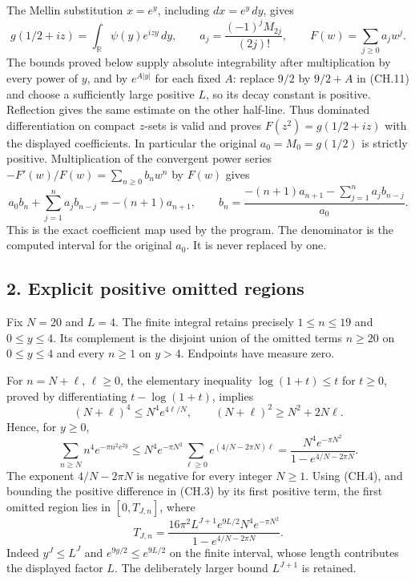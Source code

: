 The Mellin substitution \(x=e^y\), including \(dx=e^y\,dy\), gives \[
 g(1/2+iz)=\int_{\mathbb R}\psi(y)e^{izy}\,dy,\qquad
 a_j=\frac{(-1)^jM_{2j}}{(2j)!},\qquad
 F(w)=\sum_{j\ge0}a_jw^j .
\tag{CH.5}
\] The bounds proved below supply absolute integrability after multiplication by every power of \(y\), and by \(e^{A|y|}\) for each fixed \(A\): replace \(9/2\) by \(9/2+A\) in (CH.11) and choose a sufficiently large positive \(L\), so its decay constant is positive. Reflection gives the same estimate on the other half-line. Thus dominated differentiation on compact \(z\)-sets is valid and proves \(F(z^2)=g(1/2+iz)\) with the displayed coefficients. In particular the original \(a_0=M_0=g(1/2)\) is strictly positive. Multiplication of the convergent power series \(-F'(w)/F(w)=\sum_{n\ge0}b_nw^n\) by \(F(w)\) gives \[
 a_0b_n+\sum_{j=1}^n a_jb_{n-j}=-(n+1)a_{n+1},
 \qquad
 b_n=\frac{-(n+1)a_{n+1}-\sum_{j=1}^na_jb_{n-j}}{a_0}.
\tag{CH.6}
\] This is the exact coefficient map used by the program. The denominator is the computed interval for the original \(a_0\). It is never replaced by one.

\subsection{2. Explicit positive omitted regions}\label{explicit-positive-omitted-regions}

Fix \(N=20\) and \(L=4\). The finite integral retains precisely \(1\le n\le19\) and \(0\le y\le4\). Its complement is the disjoint union of the omitted terms \(n\ge20\) on \(0\le y\le4\) and every \(n\ge1\) on \(y>4\). Endpoints have measure zero.

For \(n=N+\ell\), \(\ell\ge0\), the elementary inequality \(\log(1+t)\le t\) for \(t\ge0\), proved by differentiating \(t-\log(1+t)\), implies \[
 (N+\ell)^4\le N^4e^{4\ell/N},\qquad
 (N+\ell)^2\ge N^2+2N\ell .
\tag{CH.7}
\] Hence, for \(y\ge0\), \[
 \sum_{n\ge N}n^4e^{-\pi n^2e^{2y}}
 \le
 N^4e^{-\pi N^2}
 \sum_{\ell\ge0}e^{(4/N-2\pi N)\ell}
 =
 \frac{N^4e^{-\pi N^2}}{1-e^{4/N-2\pi N}} .
\tag{CH.8}
\] The exponent \(4/N-2\pi N\) is negative for every integer \(N\ge1\). Using (CH.4), and bounding the positive difference in (CH.3) by its first positive term, the first omitted region lies in \([0,T_{J,n}]\), where \[
 T_{J,n}=
 \frac{16\pi^2L^{J+1}e^{9L/2}N^4e^{-\pi N^2}}
 {1-e^{4/N-2\pi N}} .
\tag{CH.9}
\] Indeed \(y^J\le L^J\) and \(e^{9y/2}\le e^{9L/2}\) on the finite interval, whose length contributes the displayed factor \(L\). The deliberately larger bound \(L^{J+1}\) is retained.

